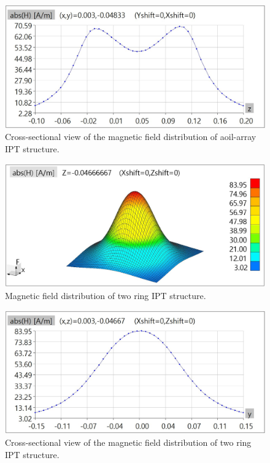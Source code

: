 \begin{figure}[htbp]
    \centering
    \includegraphics[width=0.9\linewidth]{images/4_coil_array_near_field_distribution_cut.JPG}
    \caption{Cross-sectional view of the magnetic field distribution of aoil-array IPT structure.}
\end{figure}

\begin{figure}[htbp]
    \centering
    \includegraphics[width=0.9\linewidth]{images/4_two_ring_near_field_distribution.JPG}
    \caption{Magnetic field distribution of two ring IPT structure.}
\end{figure}

\begin{figure}[htbp]
    \centering
    \includegraphics[width=0.9\linewidth]{images/4_two_ring_near_field_distribution_cut.JPG}
    \caption{Cross-sectional view of the magnetic field distribution of two ring IPT structure.}
\end{figure}

